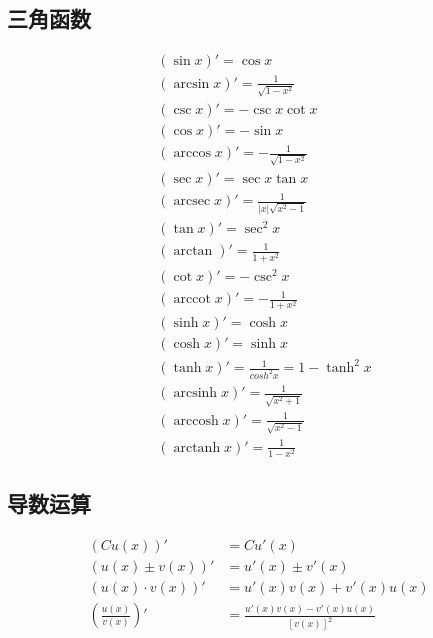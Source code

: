 \subsection{三角函数}
\begin{align}
&(\sin x)' = \cos x \label{derivative_sin}\\
&(\arcsin x)' = \frac{1}{\sqrt{1-x^2}} \label{derivative_arcsin}\\
&(\csc x)' = -\csc x\cot x \label{derivative_csc}\\
&(\cos x)' = -\sin x \label{derivative_cos}\\
&(\arccos x)' = -\frac{1}{\sqrt{1-x^2}} \label{derivative_arccos}\\
&(\sec x)' = \sec x\tan x \label{derivative_sec}\\
&(\operatorname{arcsec}{x})'=\frac{1}{\left|x\right|\sqrt{x^2-1}} \label{derivative_arcsec}\\
&(\tan x)' = \sec^2x \label{derivative_tan}\\
&(\arctan)' = \frac{1}{1+x^2} \label{derivative_arctan}\\
&(\cot x)' = -\csc^2x \label{derivative_cot}\\
&(\operatorname{arccot}{x})' = -\frac{1}{1+x^2}\label{derivative_arccot}\\
&(\sinh x)' = \cosh x \label{derivative_sinh}\\
&(\cosh x)' = \sinh x \label{derivative_cosh}\\
&(\tanh x)' = \frac{1}{cosh^2 x}=1-\tanh^2x \label{derivative_tanh}\\
&(\operatorname{arcsinh}{x})' =\frac{1}{\sqrt{x^2+1}} \label{derivative_arcsinh}\\
&(\operatorname{arccosh}{x})'=\frac{1}{\sqrt{x^2-1}} \label{derivative_arccosh}\\
&(\operatorname{arctanh}{x})'=\frac{1}{1-x^2} \label{derivative_arctanh}
\end{align}
\subsection{导数运算}
\begin{center}
\end{center}
\begin{align}
  (Cu(x))'&= Cu'(x)\label{limit_operation_1}\\
  (u(x)\pm v(x))'&=u'(x)\pm v'(x)\label{limit_operation_2}\\
  (u(x)\cdotp v(x))'&=u'(x)v(x)+v'(x)u(x)\label{limit_operation_3}\\
  \left(\frac{u(x)}{v(x)}\right)'&=\frac{u'(x)v(x)-v'(x)u(x)}{\left[v(x)\right]^2}\label{limit_operation_4}
\end{align}
